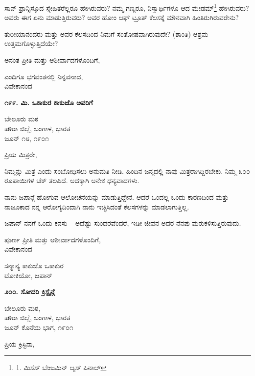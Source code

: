 ಸಾನ್ ಫ್ರಾನ್ಸಿಸ್ಕೊದ ಸ್ನೇಹಿತರೆಲ್ಲರೂ ಹೇಗಿರುವರು? ನಮ್ಮ ಗಣ್ಯರೂ, ನಿಸ್ವಾರ್ಥಿಗಳೂ ಆದ ಮೇಡಮ್​\footnote{1. ಮಿಸೆಸ್ ಬೆಂಜಮಿನ್ ಆ್ಯಸ್ ಪಿನಾಲ್} ಹೇಗಿರುವರು? ಅವರು ಈಗ ಏನು ಮಾಡುತ್ತಿರುವರು? ಅವರ ಹೋಂ ಆಫ್ ಟ್ರೂತ್ ಕೆಲಸಕ್ಕೆ ಮೌನವಾಗಿ ಹಿಂತಿರುಗಿರುವರೇನು?

ತುರೀಯಾನಂದರು ಮತ್ತು ಅವರ ಕೆಲಸದಿಂದ ನಿಮಗೆ ಸಂತೋಷವಾಗಿರುವುದೇ? (ಶಾಂತಿ) ಆಶ್ರಮ ಉತ್ತಮಗೊಳ್ಳುತ್ತಿದೆಯೇ?

ಅನಂತ ಪ್ರೀತಿ ಮತ್ತು ಆಶೀರ್ವಾದಗಳೊಂದಿಗೆ,

\begin{flushright}
ಎಂದಿಗೂ ಭಗವಂತನಲ್ಲಿ ನಿನ್ನವನಾದ,\\ವಿವೇಕಾನಂದ
\end{flushright}

\begin{center}
\textbf{೧೯೯. ಮಿ. ಒಕಾಕುರ ಕಾಕುಜೊ ಅವರಿಗೆ}
\end{center}

\begin{flushright}
ಬೇಲೂರು ಮಠ\\ಹೌರಾ ಜಿಲ್ಲೆ, ಬಂಗಾಳ, ಭಾರತ\\ಜೂನ್ ೧೮, ೧೯೦೧
\end{flushright}

ಪ್ರಿಯ ಮಿತ್ರರೇ,

ನಿಮ್ಮನ್ನು ಮಿತ್ರ ಎಂದು ಸಂಬೋಧಿಸಲು ಅನುಮತಿ ನೀಡಿ. ಹಿಂದಿನ ಜನ್ಮದಲ್ಲಿ ನಾವು ಮಿತ್ರರಾಗಿದ್ದಿರಬೇಕು. ನಿಮ್ಮ ೩೦೦ ರೂಪಾಯಿಗಳ ಚೆಕ್ ತಲಪಿದೆ. ಅದಕ್ಕಾಗಿ ಅನೇಕ ಧನ್ಯವಾದಗಳು.

ನಾನು ಜಪಾನ್ಗೆ ಹೋಗುವ ಆಲೋಚನೆಯನ್ನು ಮಾಡುತ್ತಿದ್ದೇನೆ. ಆದರೆ ಒಂದಲ್ಲ ಒಂದು ಕಾರಣದಿಂದ ಮತ್ತು ನಾಜೂಕಾದ ನನ್ನ ಆರೋಗ್ಯದಿಂದಾಗಿ ನಾನು ಇಚ್ಛಿಸಿದಂತೆ ಕೆಲಸಗಳನ್ನು ಮಾಡಲಾಗುತ್ತಿಲ್ಲ.

ಜಪಾನ್ ನನಗೆ ಒಂದು ಕನಸು – ಅದೆಷ್ಟು ಸುಂದರವೆಂದರೆ, ಇಡೀ ಜೀವನ ಅದರ ನೆನಪು ಮರುಕಳಿಸುತ್ತಿರುವುದು.

\begin{flushright}
ಪೂರ್ಣ ಪ್ರೀತಿ ಮತ್ತು ಆಶೀರ್ವಾದಗಳೊಂದಿಗೆ,\\ವಿವೇಕಾನಂದ
\end{flushright}

ಸನ್ಮಾನ್ಯ ಕಾಕುಜೊ ಒಕಾಕುರ\\ಟೋಕಿಯೋ, ಜಪಾನ್

\begin{center}
\textbf{೨೦೦. ಸೋದರಿ ಕ್ರಿಸ್ಟೈನ್ಗೆ}
\end{center}

\begin{flushright}
ಬೇಲೂರು ಮಠ,\\ಹೌರಾ ಜಿಲ್ಲೆ, ಬಂಗಾಳ, ಭಾರತ\\ಜೂನ್ ಕೊನೆಯ ಭಾಗ, ೧೯೦೧
\end{flushright}

ಪ್ರಿಯ ಕ್ರಿಸ್ಟಿನಾ,

